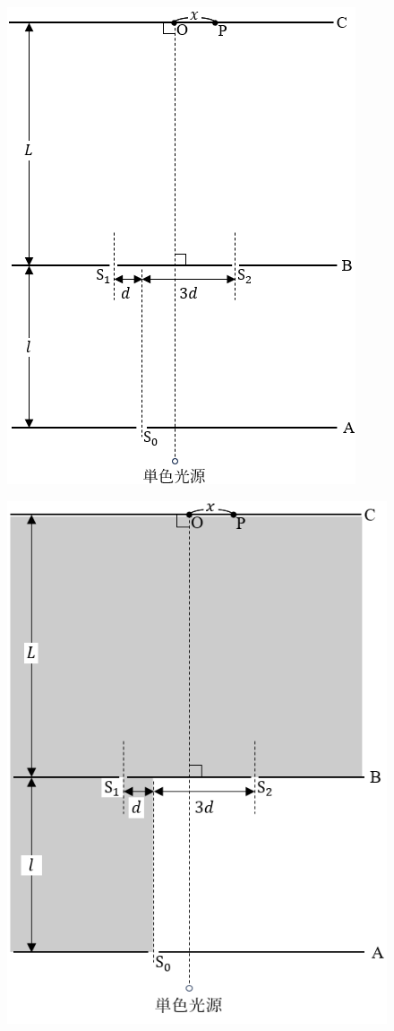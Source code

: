 \begin{figure}[H]
\begin{minipage}{.45\columnwidth}
    \caption{}
  \end{minipage}
  \begin{minipage}{.45\columnwidth}
    \centering
    \includegraphics[width=\columnwidth]{../graphs/yokoichi_23_3-2.png}
    \caption{}
  \end{minipage}
\end{figure}
\begin{figure}[H]
  \centering
  \includegraphics[width=.45\columnwidth]{../graphs/yokoichi_23_3-3.png}
  \caption{}
\end{figure}

